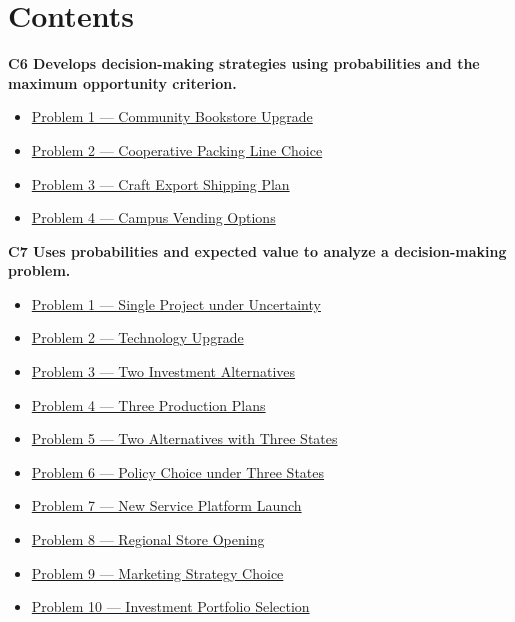 
\usepackage[hidelinks]{hyperref}

	
	\section*{Contents}
	\noindent\textbf{C6 Develops decision-making strategies using probabilities and the maximum opportunity criterion.}
	\begin{itemize}
		\item \hyperlink{c6-ex1}{Problem 1 — Community Bookstore Upgrade}
		\item \hyperlink{c6-ex2}{Problem 2 — Cooperative Packing Line Choice}
		\item \hyperlink{c6-ex3}{Problem 3 — Craft Export Shipping Plan}
		\item \hyperlink{c6-ex4}{Problem 4 — Campus Vending Options}
	\end{itemize}
	\noindent\textbf{C7 Uses probabilities and expected value to analyze a decision-making problem.}
	\begin{itemize}
		\item \hyperlink{c7-ex1}{Problem 1 — Single Project under Uncertainty}
		\item \hyperlink{c7-ex2}{Problem 2 — Technology Upgrade}
		\item \hyperlink{c7-ex3}{Problem 3 — Two Investment Alternatives}
		\item \hyperlink{c7-ex4}{Problem 4 — Three Production Plans}
		\item \hyperlink{c7-ex5}{Problem 5 — Two Alternatives with Three States}
		\item \hyperlink{c7-ex6}{Problem 6 — Policy Choice under Three States}
		\item \hyperlink{c7-ex7}{Problem 7 — New Service Platform Launch}
		\item \hyperlink{c7-ex8}{Problem 8 — Regional Store Opening}
		\item \hyperlink{c7-ex9}{Problem 9 — Marketing Strategy Choice}
		\item \hyperlink{c7-ex10}{Problem 10 — Investment Portfolio Selection}
	\end{itemize}
	
	
	
